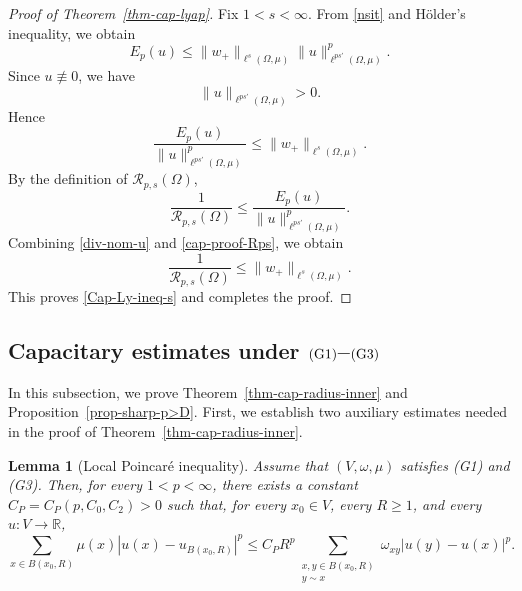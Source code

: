 \documentclass[twoside,12pt,letter]{article}
\theoremstyle{plain}
\newtheorem{lemma}[theorem]{Lemma}
\theoremstyle{definition}
\theoremstyle{remark}
\numberwithin{equation}{section}
\begin{document}
\begin{proof}[Proof of Theorem~\ref{thm-cap-lyap}]
Fix \(1<s<\infty\). From \eqref{nsit} and H\"older's inequality, we obtain
\[
E_p(u)
\le
\|w_+\|_{\ell^s(\Omega,\mu)}
\|u\|_{\ell^{ps'}(\Omega,\mu)}^p.
\]
Since \(u\not\equiv 0\), we have
\[
\|u\|_{\ell^{ps'}(\Omega,\mu)}>0.
\]
Hence
\begin{equation}\label{div-nom-u}
\frac{E_p(u)}{\|u\|_{\ell^{ps'}(\Omega,\mu)}^p}
\le
\|w_+\|_{\ell^s(\Omega,\mu)}.
\end{equation}
By the definition of \(\mathcal{R}_{p,s}(\Omega)\),
\begin{equation}\label{cap-proof-Rps}
\frac{1}{\mathcal{R}_{p,s}(\Omega)}
\le
\frac{E_p(u)}
{\|u\|_{\ell^{ps'}(\Omega,\mu)}^p}.
\end{equation}
Combining \eqref{div-nom-u} and \eqref{cap-proof-Rps}, we obtain
\[
\frac{1}{\mathcal{R}_{p,s}(\Omega)}
\le
\|w_+\|_{\ell^s(\Omega,\mu)}.
\]
This proves \eqref{Cap-Ly-ineq-s} and completes the proof.
\end{proof}


\subsection{Capacitary estimates under \({\rm(G1)}\)--\({\rm(G3)}\)}

In this subsection, we prove Theorem~\ref{thm-cap-radius-inner} and
Proposition~\ref{prop-sharp-p>D}. First, we establish two auxiliary estimates
needed in the proof of Theorem~\ref{thm-cap-radius-inner}.

\begin{lemma}[Local Poincar\'e inequality]\label{lem-local-poincare}
Assume that \((V,\omega,\mu)\) satisfies {\rm(G1)} and {\rm(G3)}. Then, for
every \(1<p<\infty\), there exists a constant \(C_P=C_P(p,C_0,C_2)>0\)
such that, for every \(x_0\in V\), every \(R\ge1\), and every
\(u:V\to\mathbb R\),
\begin{equation}\label{local-poincare}
\sum_{x\in B(x_0,R)}\mu(x)|u(x)-u_{B(x_0,R)}|^p
\le
C_P R^p
\sum_{\substack{x,y\in B(x_0,R)\\ y\sim x}}
\omega_{xy}|u(y)-u(x)|^p.
\end{equation}
\end{lemma}
\end{document}

